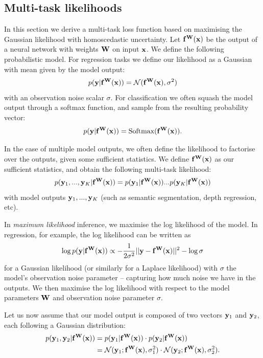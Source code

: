 \subsection{Multi-task likelihoods}
\label{sec:mt_loss}

In this section we derive a multi-task loss function based on maximising the Gaussian likelihood with homoscedastic uncertainty.
Let $\mathbf{f}^{\mathbf{W}}(\mathbf{x})$ be the output of a neural network with weights $\mathbf{W}$ on input $\mathbf{x}$. We define the following probabilistic model. 
For regression tasks we define our likelihood as a Gaussian with mean given by the model output:
\begin{equation}
p(\mathbf{y} | \mathbf{f}^{\mathbf{W}}(\mathbf{x})) = \mathcal{N}(\mathbf{f}^{\mathbf{W}}(\mathbf{x}), \sigma^2)
\end{equation}
with an observation noise scalar $\sigma$. 
For classification we often squash the model output through a softmax function, and sample from the resulting probability vector:
\begin{equation}
p(\mathbf{y} | \mathbf{f}^{\mathbf{W}}(\mathbf{x})) = \text{Softmax}(\mathbf{f}^{\mathbf{W}}(\mathbf{x})).
\end{equation}

In the case of multiple model outputs, we often define the likelihood to factorise over the outputs, given some sufficient statistics. We define $\mathbf{f}^{\mathbf{W}}(\mathbf{x})$ as our sufficient statistics, and obtain the following multi-task likelihood:
\begin{equation}
p(\mathbf{y}_1, ..., \mathbf{y}_K | \mathbf{f}^{\mathbf{W}}(\mathbf{x})) = p(\mathbf{y}_1 | \mathbf{f}^{\mathbf{W}}(\mathbf{x})) ... p(\mathbf{y}_K | \mathbf{f}^{\mathbf{W}}(\mathbf{x}))
\end{equation}
with model outputs $\mathbf{y}_1, ..., \mathbf{y}_K$ (such as semantic segmentation, depth regression, etc).

In \textit{maximum likelihood} inference, we maximise the log likelihood of the model.
In regression, for example, the log likelihood can be written as
\begin{equation}
\log p(\mathbf{y} | \mathbf{f}^{\mathbf{W}}(\mathbf{x})) \propto 
-\frac{1}{2 \sigma^2}||\mathbf{y} - \mathbf{f}^{\mathbf{W}}(\mathbf{x})||^2 - \log \sigma
\end{equation}
for a Gaussian likelihood (or similarly for a Laplace likelihood)
with $\sigma$ the model's observation noise parameter -- capturing how much noise we have in the outputs. We then maximise the log likelihood with respect to the model parameters $\mathbf{W}$ and observation noise parameter $\sigma$.

Let us now assume that our model output is composed of two vectors $\mathbf{y}_1$ and $\mathbf{y}_2$, each following a Gaussian distribution:
\begin{equation}
\begin{split}
p(\mathbf{y}_1, \mathbf{y}_2 | \mathbf{f}^{\mathbf{W}}(\mathbf{x})) &= 
p(\mathbf{y}_1 | \mathbf{f}^{\mathbf{W}}(\mathbf{x})) \cdot p(\mathbf{y}_2 | \mathbf{f}^{\mathbf{W}}(\mathbf{x})) \\
&= 
\mathcal{N}(\mathbf{y}_1; \mathbf{f}^{\mathbf{W}}(\mathbf{x}), \sigma_1^2) \cdot
\mathcal{N}(\mathbf{y}_2; \mathbf{f}^{\mathbf{W}}(\mathbf{x}), \sigma_2^2).
\end{split}
\end{equation}

